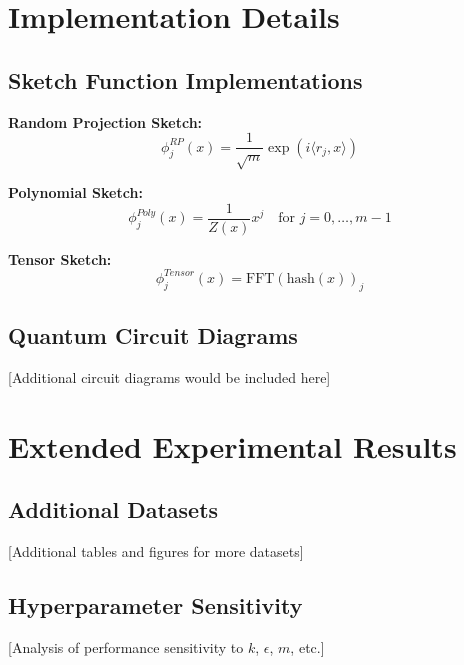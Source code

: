 \documentclass[11pt]{article}
\begin{document}
\section{Implementation Details}

\subsection{Sketch Function Implementations}

\textbf{Random Projection Sketch:}
\begin{equation}
\phi_j^{RP}(x) = \frac{1}{\sqrt{m}} \exp(i \langle r_j, x \rangle)
\end{equation}

\textbf{Polynomial Sketch:}
\begin{equation}
\phi_j^{Poly}(x) = \frac{1}{Z(x)} x^j \quad \text{for } j = 0, \ldots, m-1
\end{equation}

\textbf{Tensor Sketch:}
\begin{equation}
\phi_j^{Tensor}(x) = \text{FFT}(\text{hash}(x))_j
\end{equation}

\subsection{Quantum Circuit Diagrams}

[Additional circuit diagrams would be included here]

\section{Extended Experimental Results}

\subsection{Additional Datasets}

[Additional tables and figures for more datasets]

\subsection{Hyperparameter Sensitivity}

[Analysis of performance sensitivity to $k$, $\epsilon$, $m$, etc.]
\end{document}
